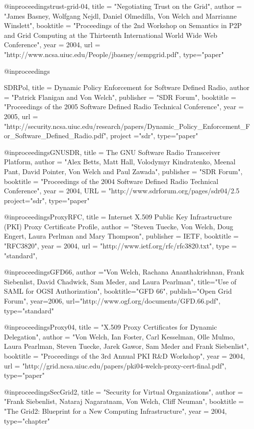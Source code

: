 @inproceedings{trust-grid-04,
title   = "Negotiating {T}rust on the {G}rid",
author = "James Basney, Wolfgang Nejdl, Daniel Olmedilla, Von Welch and Marrianne Winslett",
booktitle = "Proceedings of the 2nd Workshop on Semantics in P2P and Grid Computing at the Thirteenth International World Wide Web Conference",
year = {2004},
url = "http://www.ncsa.uiuc.edu/People/jbasney/sempgrid.pdf",
type="paper"
}

@inproceedings{SDRPol,
title   = {Dynamic Policy Enforcement for Software Defined Radio},
author = "Patrick Flanigan and Von Welch",
publisher = "SDR Forum",
booktitle = "Proceedings of the 2005 Software Defined Radio Technical Conference",
year = {2005},
url = "http://security.ncsa.uiuc.edu/research/papers/Dynamic_Policy_Enforcement_For_Software_Defined_Radio.pdf",
project ="sdr",
type="paper"

}

@inproceedings{GNUSDR,
title   = {The GNU Software Radio Transceiver Platform},
author = "Alex Betts, Matt Hall, Volodymyr Kindratenko, Meenal Pant, David Pointer, Von Welch and Paul Zawada",
publisher = "SDR Forum",
booktitle = "Proceedings of the 2004 Software Defined Radio Technical Conference",
year = {2004},
URL = "http://www.sdrforum.org/pages/sdr04/2.5%
project="sdr",
type="paper"
}

@inproceedings{ProxyRFC,
title   = {Internet X.509 Public Key Infrastructure (PKI) Proxy Certificate Profile},
author = "Steven Tuecke, Von Welch, Doug Engert, Laura Perlman and Mary Thompson",
publisher = IETF,
booktitle = "RFC3820",
year = {2004},
url = "http://www.ietf.org/rfc/rfc3820.txt",
type = "standard",
}

@inproceedings{GFD66,
author ="Von Welch, Rachana Ananthakrishnan, Frank Siebenlist, David Chadwick, Sam Meder, and Laura Pearlman",
title="Use of SAML for OGSI Authorization",
booktitle="GFD 66",
publish="Open Grid Forum",
year={2006},
url="http://www.ogf.org/documents/GFD.66.pdf",
type="standard"
}

@inproceedings{Proxy04,
title	= "X.509 {P}roxy {C}ertificates for Dynamic Delegation",
author  = "Von Welch, Ian Foster, Carl Kesselman, Olle Mulmo, Laura Pearlman, Steven Tuecke, Jarek Gawor, Sam Meder and Frank Siebenlist",
booktitle = "Proceedings of the 3rd Annual PKI R\&D Workshop",
year = {2004},
url = "http://grid.ncsa.uiuc.edu/papers/pki04-welch-proxy-cert-final.pdf",
type="paper"
}

@inproceedings{SecGrid2,
title	= "Security for Virtual Organizations",
author  = "Frank Siebenlist, Nataraj Nagaratnam, Von Welch, Cliff Neuman",
booktitle = "The Grid2: Blueprint for a New Computing Infrastructure",
year = {2004},
type="chapter"
}

